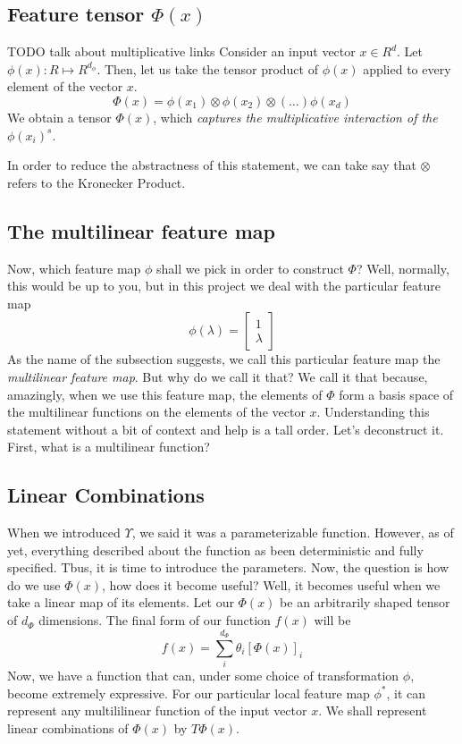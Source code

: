 \documentclass{article}
\theoremstyle{definition}
\theoremstyle{definition}
\begin{document}
\subsection{Feature tensor $\Phi(x)$}
TODO talk about multiplicative links
Consider an input vector $x \in R^d$. Let $\phi(x) : R \mapsto R^{d_{\phi}}$.  
Then, let us take the tensor product of $\phi(x)$ applied to every element of the vector $x$.
\begin{equation}
    \Phi(x) = \phi(x_1) \otimes  \phi(x_2) 
                \otimes (\dots) \phi(x_d)
\end{equation}
We obtain a tensor $\Phi(x)$, which \emph{captures the multiplicative interaction of the $\phi(x_i)^s$}.

In order to reduce the abstractness of this statement, we can take say that $\otimes$ refers to the Kronecker Product.

\subsection{The multilinear feature map}
Now, which feature map $\phi$ shall we pick in order to construct $\Phi$?
Well, normally, this would be up to you, but in this project we deal with the particular feature map
\begin{equation}
    \phi(\lambda) = 
    \begin{bmatrix}
        1 \\
        \lambda
    \end{bmatrix}
\end{equation}
As the name of the subsection suggests, we call this particular feature map the \emph{multilinear feature map}.
But why do we call it that?
We call it that because, amazingly, when we use this feature map, the elements of $\Phi$ form a basis space of the multilinear functions on the elements of the vector $x$.
Understanding this statement without a bit of context and help is a tall order. Let's deconstruct it.
First, what is a multilinear function?


\subsection{Linear Combinations}
When we introduced $\Upsilon$, we said it was a parameterizable function.
However, as of yet, everything described about the function as been deterministic and fully specified.
Tbus, it is time to introduce the parameters. 
Now, the question is how do we use $\Phi(x)$, how does it become useful? 
Well, it becomes useful when we take a linear map of its elements. Let our $\Phi(x)$ be an 
arbitrarily shaped tensor of $d_{\Phi}$ dimensions. The final form of our 
function $f(x)$ will be
\begin{equation} \label{eq:model}
    f(x) = \sum_{i}^{d_{\Phi}} \theta_i [\Phi(x)]_i
\end{equation}
Now, we have a function that can, under some choice of transformation
$\phi$, become extremely expressive. For our particular local feature map 
$\phi^*$, it can represent any multililinear function  of the input vector $x$. 
We shall represent linear combinations of $\Phi(x)$ by $T\Phi(x)$.
\end{document}
